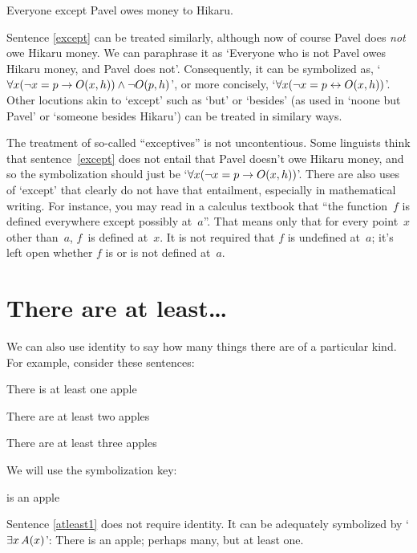 \begin{earg}
	\item[\ex{except}] Everyone except Pavel owes money to Hikaru.
	\end{earg}
Sentence \ref{except} can be treated similarly, although now of course Pavel does \emph{not} owe Hikaru money. We can paraphrase it as `Everyone who is not Pavel owes Hikaru money, and Pavel does not'. Consequently, it can be symbolized as, `$\forall x(\neg x = p \rightarrow \mathord{O}(x,h)) \wedge \neg \mathord{O}(p,h)$', or more concisely, `$\forall x(\neg x = p \leftrightarrow \mathord{O}(x,h))$'. Other locutions akin to `except' such as `but' or `besides' (as used in `noone but Pavel' or `someone besides Hikaru') can be treated in similary ways.

The treatment of so-called ``exceptives'' is not uncontentious. Some linguists think that sentence~\ref{except} does not entail that Pavel doesn't owe Hikaru money, and so the symbolization should just be `$\forall x(\neg x = p \rightarrow \mathord{O}(x,h))$'.  There are also uses of `except' that clearly do not have that entailment, especially in mathematical writing.  For instance, you may read in a calculus textbook that ``the function~$f$ is defined everywhere except possibly at~$a$''.  That means only that for every point~$x$ other than~$a$, $f$~is defined at~$x$. It is not required that $f$ is undefined at~$a$; it's left open whether $f$ is or is not defined at~$a$.

\section{There are at least\ldots}
We can also use identity to say how many things there are of a particular kind. For example, consider these sentences:
\begin{earg}
\item[\ex{atleast1}] There is at least one apple
\item[\ex{atleast2}] There are at least two apples
\item[\ex{atleast3}] There are at least three apples
\end{earg}
We will use the symbolization key:
	\begin{ekey}
		\item[\atom{A}{x}]  is an apple
	\end{ekey}
Sentence \ref{atleast1} does not require identity. It can be adequately symbolized by `$\exists x\, \mathord{A}(x)$': There is an apple; perhaps many, but at least one.

